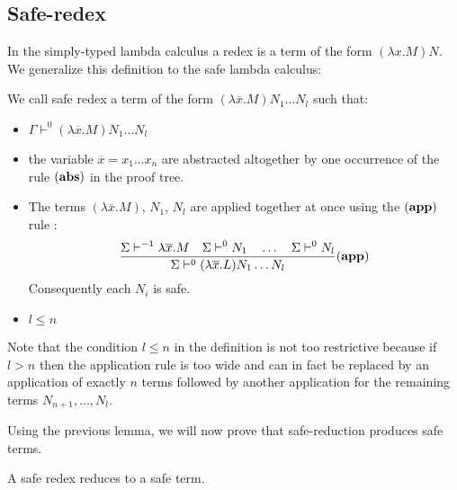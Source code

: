 \subsection{Safe-redex}
In the simply-typed lambda calculus a redex is a term of the form
$(\lambda x . M) N$. We generalize this definition to the safe
lambda calculus:
\begin{dfn}
We call safe redex a term of the form $(\lambda \overline{x} . M)
N_1 \ldots N_l$ such that:
\begin{itemize}
\item $ \Gamma \vdash^0 (\lambda \overline{x} . M) N_1 \ldots N_l $
\item the variable $\overline{x}=x_1\ldots x_n$ are abstracted altogether by one occurrence of the rule $\mathbf{(abs)}$ in the proof tree.
\item The terms $(\lambda \overline{x} . M)$, $N_1$, $N_l$ are applied together at once using the $\mathbf{(app)}$ rule :
$$   \frac{\displaystyle 
            \Sigma \vdash^{-1} \lambda \overline{x} . M
            \quad
            \Sigma \vdash^0 N_1         \quad \ldots \quad \Sigma \vdash^0 N_l
    }{
       \Sigma \vdash^0 (\lambda \overline{x} . L) N_1 \ldots N_l
    } (\mathbf{app})
$$
Consequently each $N_i$ is safe.

\item $l\leq n$
\end{itemize}
\end{dfn}

Note that the condition $l\leq n$ in the definition is not too
restrictive because if $l>n$ then the application rule is too wide
and can in fact be replaced by an application of exactly $n$ terms
followed by another application for the remaining terms $N_{n+1},
\ldots, N_l$.




Using the previous lemma, we will now prove that safe-reduction
produces safe terms.

\begin{lem}
\label{lem:safereduction} A safe redex reduces to a safe term.
\end{lem}

